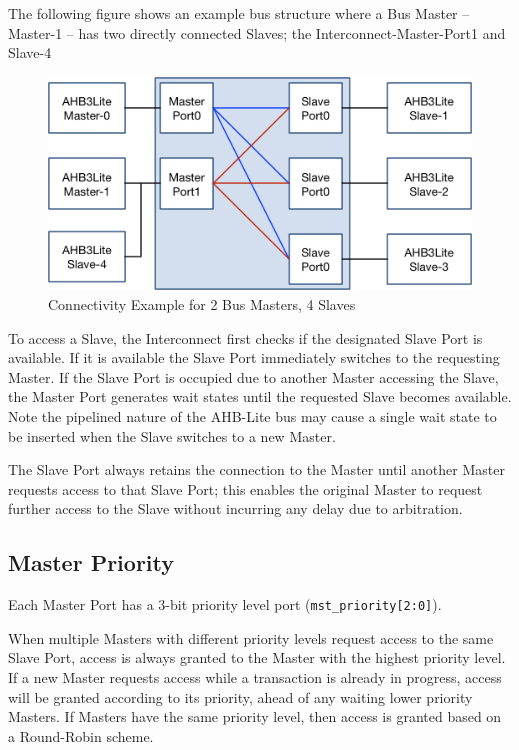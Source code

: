 The following figure shows an example bus structure where a Bus Master -- Master-1
-- has two directly connected Slaves; the Interconnect-Master-Port1 and
Slave-4

\begin{figure}[tbh]
	\includegraphics{assets/img/ahb-lite-switch-sys2.png}
	\caption{Connectivity Example for 2 Bus Masters, 4 Slaves}
	\label{fig:ahb-lite-switch-sys2}
\end{figure}



To access a Slave, the Interconnect first checks if the designated Slave
Port is available. If it is available the Slave Port immediately
switches to the requesting Master. If the Slave Port is occupied due to
another Master accessing the Slave, the Master Port generates wait
states until the requested Slave becomes available. Note the pipelined
nature of the AHB-Lite bus may cause a single wait state to be inserted
when the Slave switches to a new Master.

The Slave Port always retains the connection to the Master until another
Master requests access to that Slave Port; this enables the original
Master to request further access to the Slave without incurring any
delay due to arbitration.

\subsection{Master Priority}\label{master-priority}

Each Master Port has a 3-bit priority level port
(\texttt{mst\_priority[2:0]}).

When multiple Masters with different priority levels request access to
the same Slave Port, access is always granted to the Master with the
highest priority level. If a new Master requests access while a
transaction is already in progress, access will be granted according to
its priority, ahead of any waiting lower priority Masters. If Masters
have the same priority level, then access is granted based on a
Round-Robin scheme.

